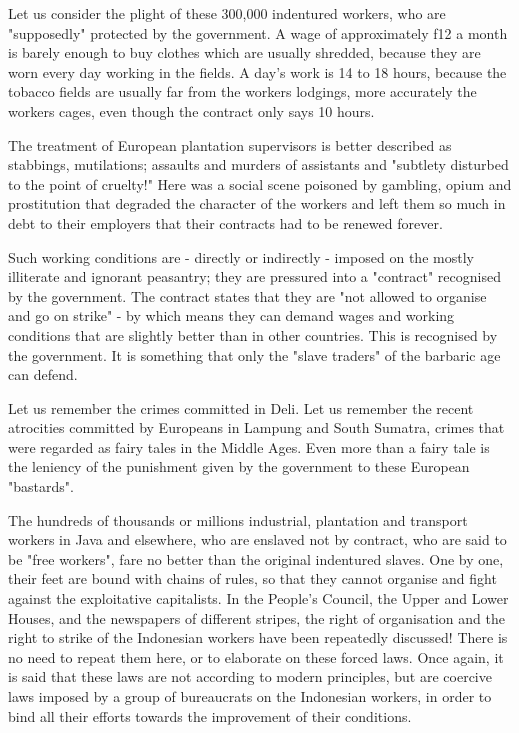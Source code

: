 Let us consider the plight of these 300,000 indentured workers, 
who are "supposedly" protected by the government. A wage of approximately f12 a 
month is barely enough to buy clothes which are usually shredded, because they 
are worn every day working in the fields. A day's work is 14 to 18 hours, because 
the tobacco fields are usually far from the workers lodgings, more accurately the 
workers cages, even though the contract only says 10 hours.\nline

The treatment of European plantation supervisors is better described as stabbings, mutilations; 
assaults and murders of assistants and "subtlety disturbed to the point of cruelty!" 
Here was a social scene poisoned by gambling, opium and prostitution that degraded 
the character of the workers and left them so much in debt to their employers that their contracts had to be renewed forever.\nline

Such working conditions are - directly or indirectly - imposed on the mostly 
illiterate and ignorant peasantry; they are pressured into a "contract" recognised 
by the government. The contract states that they are "not allowed to organise and 
go on strike" - by which means they can demand wages and working conditions that are 
slightly better than in other countries. This is recognised by the government. 
It is something that only the "slave traders" of the barbaric age can defend.\nline

Let us remember the crimes committed in Deli. Let us remember the recent atrocities 
committed by Europeans in Lampung and South Sumatra, crimes that were regarded as fairy 
tales in the Middle Ages. Even more than a fairy tale is the leniency of the punishment 
given by the government to these European "bastards".\nline

The hundreds of thousands or millions industrial, plantation and 
transport workers in Java and elsewhere, who are enslaved not by contract, 
who are said to be "free workers", fare no better than the original indentured 
slaves. One by one, their feet are bound with chains of rules, so that they 
cannot organise and fight against the exploitative capitalists. In the People's 
Council, the Upper and Lower Houses, and the newspapers of different stripes, 
the right of organisation and the right to strike of the Indonesian workers have 
been repeatedly discussed! There is no need to repeat them here, or to elaborate 
on these forced laws. Once again, it is said that these laws are not according to 
modern principles, but are coercive laws imposed by a group of bureaucrats on 
the Indonesian workers, in order to bind all their efforts towards the improvement of their conditions.\nline


